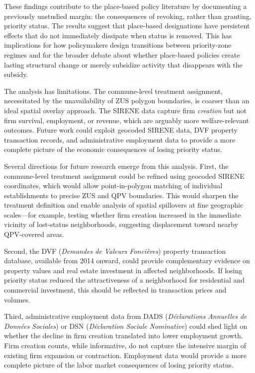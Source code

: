 \documentclass[12pt]{article}
\begin{document}
These findings contribute to the place-based policy literature by documenting a previously unstudied margin: the consequences of revoking, rather than granting, priority status. The results suggest that place-based designations have persistent effects that do not immediately dissipate when status is removed. This has implications for how policymakers design transitions between priority-zone regimes and for the broader debate about whether place-based policies create lasting structural change or merely subsidize activity that disappears with the subsidy.

The analysis has limitations. The commune-level treatment assignment, necessitated by the unavailability of ZUS polygon boundaries, is coarser than an ideal spatial overlay approach. The SIRENE data capture firm \textit{creation} but not firm survival, employment, or revenue, which are arguably more welfare-relevant outcomes. Future work could exploit geocoded SIRENE data, DVF property transaction records, and administrative employment data to provide a more complete picture of the economic consequences of losing priority status.

Several directions for future research emerge from this analysis. First, the commune-level treatment assignment could be refined using geocoded SIRENE coordinates, which would allow point-in-polygon matching of individual establishments to precise ZUS and QPV boundaries. This would sharpen the treatment definition and enable analysis of spatial spillovers at fine geographic scales---for example, testing whether firm creation increased in the immediate vicinity of lost-status neighborhoods, suggesting displacement toward nearby QPV-covered areas.

Second, the DVF (\textit{Demandes de Valeurs Fonci\`eres}) property transaction database, available from 2014 onward, could provide complementary evidence on property values and real estate investment in affected neighborhoods. If losing priority status reduced the attractiveness of a neighborhood for residential and commercial investment, this should be reflected in transaction prices and volumes.

Third, administrative employment data from DADS (\textit{D\'eclarations Annuelles de Donn\'ees Sociales}) or DSN (\textit{D\'eclaration Sociale Nominative}) could shed light on whether the decline in firm creation translated into lower employment growth. Firm creation counts, while informative, do not capture the intensive margin of existing firm expansion or contraction. Employment data would provide a more complete picture of the labor market consequences of losing priority status.
\end{document}
